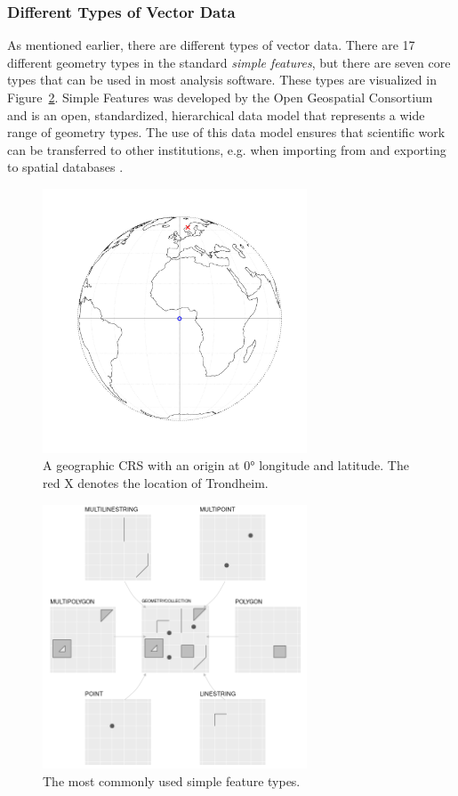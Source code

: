 \subsubsection{Different Types of Vector Data}
As mentioned earlier, there are different types of vector data. There are 17 different geometry types in the standard \textit{simple features}, but there are seven core types that can be used in most analysis software. These types are visualized in Figure~\ref{fig:sf}. Simple Features was developed by the Open Geospatial Consortium and is an open, standardized, hierarchical data model that represents a wide range of geometry types. The use of this data model ensures that scientific work can be transferred to other institutions, e.g. when importing from and exporting to spatial databases \autocite[][]{lovelace2019geocomputation}. \clearpage
\begin{figure}[H]
   \centering
       \includegraphics[page=1,width=0.7\textwidth]{globe.pdf}
 \caption{A geographic CRS with an origin at 0° longitude and latitude. The red X denotes the location of Trondheim.}
 \label{fig:globe}
\end{figure}
\begin{figure}[H]
   \centering
       \includegraphics[width=0.7\textwidth]{sf-classes.png}
 \caption{The most commonly used simple feature types.}
 \label{fig:sf}
\end{figure}

